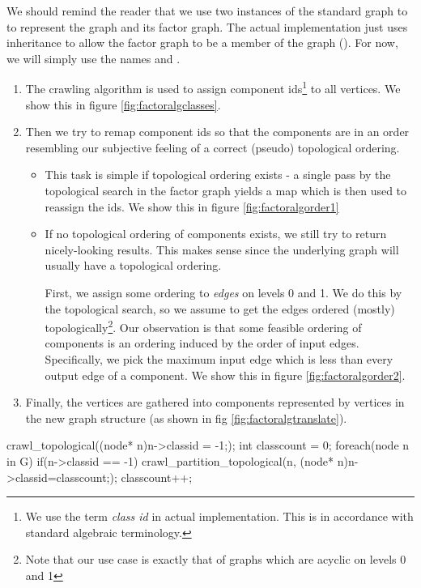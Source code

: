 We should remind the reader that we use two instances of the standard graph to to represent the graph and its factor graph. The actual implementation just uses inheritance to allow the factor graph to be a member of the graph (). For now, we will simply use the names  and .
\begin{enumerate}
  \item The crawling algorithm is used to assign component ids\footnote{We use the term \emph{class id} in actual implementation. This is in accordance with standard algebraic terminology.} to all vertices. We show this in figure \ref{fig:factoralgclasses}.
  \item Then we try to remap component ids so that the components are in an order resembling our subjective feeling of a correct (pseudo) topological ordering. 
    \begin{itemize}
      \item This task is simple if topological ordering exists - a single pass by the topological search in the factor graph yields a map which is then used to reassign the ids. We show this in figure \ref{fig:factoralgorder1}
      \item If no topological ordering of components exists, we still try to return nicely-looking results. This makes sense since the underlying graph will usually have a topological ordering. 
        
        First, we assign some ordering to \emph{edges} on levels 0 and 1. We do this by the topological search, so we assume to get the edges ordered (mostly) topologically\footnote{Note that our use case is exactly that of graphs which are acyclic on levels 0 and 1}. Our observation is that some feasible ordering of components is an ordering induced by the order of input edges. Specifically, we pick the  maximum input edge which is less than every output edge of a component. We show this in figure \ref{fig:factoralgorder2}.
  \end{itemize}
  \item Finally, the vertices are gathered into components represented by vertices in the new graph structure (as shown in fig \ref{fig:factoralgtranslate}).
\end{enumerate}

\FloatBarrier

\mybeginfigloose
\begin{code}
crawl_topological((node* n){n->classid = -1;});
int classcount = 0;
foreach(node n in G)
  if(n->classid == -1)
  {
    crawl_partition_topological(n, (node* n){n->classid=classcount;});
    classcount++;
  }
\end{code}

